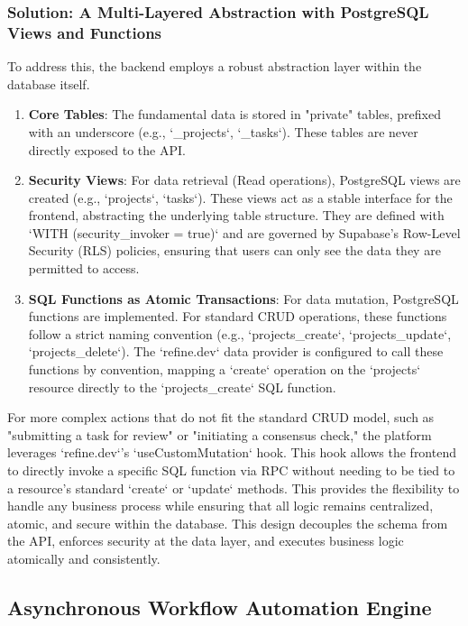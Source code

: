 \subsubsection{Solution: A Multi-Layered Abstraction with PostgreSQL Views and Functions}
To address this, the backend employs a robust abstraction layer within the database itself.
\begin{enumerate}
    \item \textbf{Core Tables}: The fundamental data is stored in "private" tables, prefixed with an underscore (e.g., `_projects`, `_tasks`). These tables are never directly exposed to the API.
    \item \textbf{Security Views}: For data retrieval (Read operations), PostgreSQL views are created (e.g., `projects`, `tasks`). These views act as a stable interface for the frontend, abstracting the underlying table structure. They are defined with `WITH (security_invoker = true)` and are governed by Supabase's Row-Level Security (RLS) policies, ensuring that users can only see the data they are permitted to access.
    \item \textbf{SQL Functions as Atomic Transactions}: For data mutation, PostgreSQL functions are implemented. For standard CRUD operations, these functions follow a strict naming convention (e.g., `projects_create`, `projects_update`, `projects_delete`). The `refine.dev` data provider is configured to call these functions by convention, mapping a `create` operation on the `projects` resource directly to the `projects_create` SQL function.
\end{enumerate}

For more complex actions that do not fit the standard CRUD model, such as "submitting a task for review" or "initiating a consensus check," the platform leverages `refine.dev`'s `useCustomMutation` hook. This hook allows the frontend to directly invoke a specific SQL function via RPC without needing to be tied to a resource's standard `create` or `update` methods. This provides the flexibility to handle any business process while ensuring that all logic remains centralized, atomic, and secure within the database. This design decouples the schema from the API, enforces security at the data layer, and executes business logic atomically and consistently.

\subsection{Asynchronous Workflow Automation Engine}
\label{subsec:workflow_automation}

